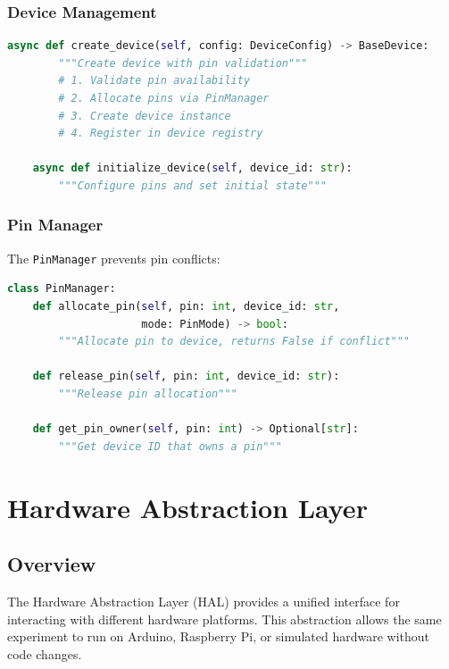 \documentclass[11pt,a4paper]{article}
\begin{document}
\subsubsection{Device Management}

\begin{lstlisting}[language=Python]
    async def create_device(self, config: DeviceConfig) -> BaseDevice:
        """Create device with pin validation"""
        # 1. Validate pin availability
        # 2. Allocate pins via PinManager
        # 3. Create device instance
        # 4. Register in device registry

    async def initialize_device(self, device_id: str):
        """Configure pins and set initial state"""
\end{lstlisting}

\subsubsection{Pin Manager}

The \texttt{PinManager} prevents pin conflicts:

\begin{lstlisting}[language=Python]
class PinManager:
    def allocate_pin(self, pin: int, device_id: str,
                     mode: PinMode) -> bool:
        """Allocate pin to device, returns False if conflict"""

    def release_pin(self, pin: int, device_id: str):
        """Release pin allocation"""

    def get_pin_owner(self, pin: int) -> Optional[str]:
        """Get device ID that owns a pin"""
\end{lstlisting}

\section{Hardware Abstraction Layer}

\subsection{Overview}

The Hardware Abstraction Layer (HAL) provides a unified interface for interacting with different hardware platforms. This abstraction allows the same experiment to run on Arduino, Raspberry Pi, or simulated hardware without code changes.
\end{document}
